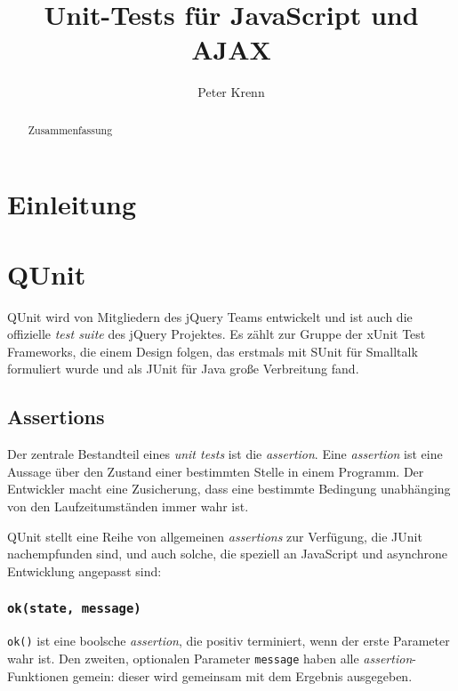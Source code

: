 \documentclass[11pt, a4paper]{article}
\title{Unit-Tests für JavaScript und AJAX}
\author{Peter Krenn}
\begin{document}
\maketitle

\begin{abstract}
Zusammenfassung
\end{abstract}

\tableofcontents

\section{Einleitung}

\section{QUnit}

QUnit\cite{zaefferer_qunit_2011} wird von Mitgliedern des jQuery
Teams\cite{resig_jquery_2011} entwickelt und ist auch die offizielle
\emph{test suite} des jQuery Projektes. Es zählt zur Gruppe der
xUnit Test Frameworks\cite{fowler_xunit_2010}, die einem Design folgen,
das erstmals mit SUnit\cite{beck_simple_1994} für Smalltalk formuliert
wurde und als JUnit für Java große Verbreitung fand.

\subsection{Assertions}

Der zentrale Bestandteil eines \emph{unit tests} ist die \emph{assertion}. Eine
\emph{assertion} ist eine Aussage über den Zustand einer bestimmten Stelle in
einem Programm\cite{wikipedia_assertion_2011}. Der Entwickler macht eine
Zusicherung, dass eine bestimmte Bedingung unabhänging von den Laufzeitumständen
immer wahr ist.

QUnit stellt eine Reihe von allgemeinen \emph{assertions} zur Verfügung,
die JUnit nachempfunden sind, und auch solche, die speziell an JavaScript
und asynchrone Entwicklung angepasst sind\cite{zaefferer_qunit_2011}:

\subsubsection*{\texttt{ok(state, message)}}

\texttt{ok()} ist eine boolsche \emph{assertion}, die positiv terminiert, wenn der
erste Parameter wahr ist. Den zweiten, optionalen Parameter \texttt{message} haben alle
\emph{assertion}-Funktionen gemein: dieser wird gemeinsam mit dem Ergebnis
ausgegeben.
\end{document}
